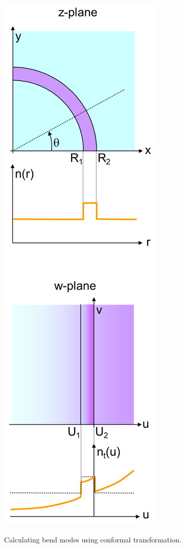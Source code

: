 \begin{marginfigure}[-6cm]
\centering
\includegraphics{complex/figures/bends_portrait}
\caption{Calculating bend modes using conformal transformation.}
\label{fig-bends}
\end{marginfigure}

